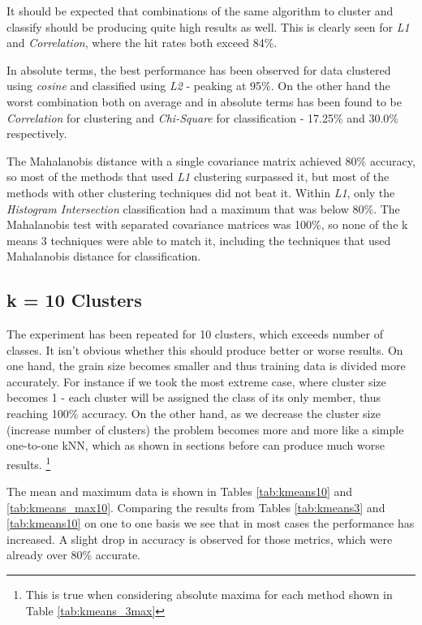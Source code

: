 \documentclass[10pt,twocolumn,letterpaper]{article}
\begin{document}
It should be expected that combinations of the same algorithm to cluster and classify should be producing quite high results as well. This is clearly seen for \textit{L1} and \textit{Correlation}, where the hit rates both exceed 84\%.

In absolute terms, the best performance has been observed for data clustered using \textit{cosine} and classified using \textit{L2} - peaking at 95\%. On the other hand the worst combination both on average and in absolute terms has been found to be \textit{Correlation} for clustering and \textit{Chi-Square} for classification - 17.25\% and 30.0\% respectively.
 
The Mahalanobis distance with a single covariance matrix achieved 80\% accuracy, so most of the methods that used \textit{L1} clustering surpassed it, but most of the methods with other clustering techniques did not beat it. Within \textit{L1}, only the \textit{Histogram Intersection} classification had a maximum that was below 80\%. The Mahalanobis test with separated covariance matrices was 100\%, so none of the k means 3 techniques were able to match it, including the techniques that used Mahalanobis distance for classification.
 
\subsection{k = 10 Clusters}

The experiment has been repeated for 10 clusters, which exceeds number of classes. It isn't obvious whether this should produce better or worse results. On one hand, the grain size becomes smaller and thus training data is divided more accurately. For instance if we took the most extreme case, where cluster size becomes 1 - each cluster will be assigned the class of its only member, thus reaching 100\% accuracy. On the other hand, as we decrease the cluster size (increase number of clusters) the problem becomes more and more like a simple one-to-one kNN, which as shown in sections before can produce much worse results. \footnote{This is true when considering absolute maxima for each method shown in Table \ref{tab:kmeans_3max}}

The mean and maximum data is shown in Tables \ref{tab:kmeans10}
and \ref{tab:kmeans_max10}. Comparing the results from Tables \ref{tab:kmeans3} and \ref{tab:kmeans10} on one to one basis we see that in most cases the performance has increased. A slight drop in accuracy is observed for those metrics, which were already over 80\% accurate. 
\end{document}
